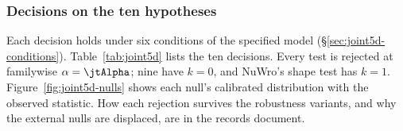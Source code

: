 
\subsubsection{Decisions on the ten hypotheses}
\label{sec:joint5d-results}

Each decision holds under six conditions of the specified model (\S\ref{sec:joint5d-conditions}). Table~\ref{tab:joint5d} lists the ten decisions. Every test is rejected at familywise $\alpha=\jtAlpha$; nine have $k=0$, and NuWro's shape test has $k=1$. Figure~\ref{fig:joint5d-nulls} shows each null's calibrated distribution with the observed statistic. How each rejection survives the robustness variants, and why the external nulls are displaced, are in the records document.

